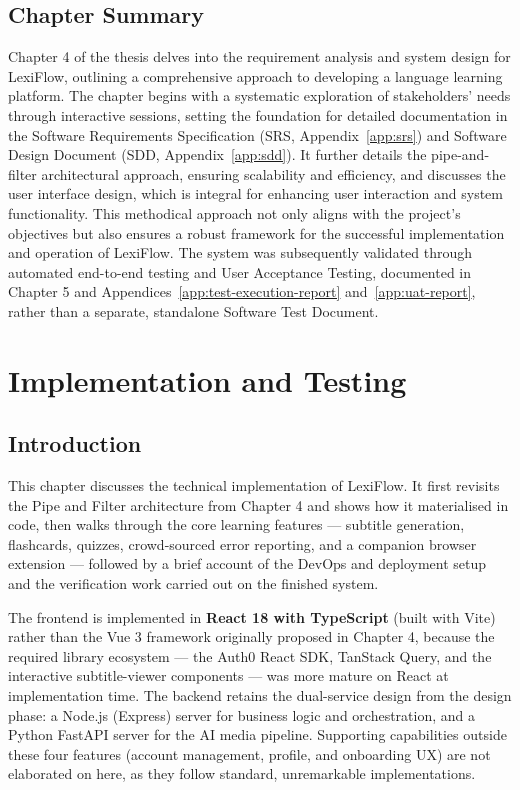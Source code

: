 \documentclass[oneside]{utmthesis}
\begin{document}
\section{Chapter Summary}
Chapter 4 of the thesis delves into the requirement analysis and system design for LexiFlow, outlining a comprehensive approach to developing a language learning platform. The chapter begins with a systematic exploration of stakeholders' needs through interactive sessions, setting the foundation for detailed documentation in the Software Requirements Specification (SRS, Appendix~\ref{app:srs}) and Software Design Document (SDD, Appendix~\ref{app:sdd}). It further details the pipe-and-filter architectural approach, ensuring scalability and efficiency, and discusses the user interface design, which is integral for enhancing user interaction and system functionality. This methodical approach not only aligns with the project's objectives but also ensures a robust framework for the successful implementation and operation of LexiFlow. The system was subsequently validated through automated end-to-end testing and User Acceptance Testing, documented in Chapter 5 and Appendices~\ref{app:test-execution-report} and~\ref{app:uat-report}, rather than a separate, standalone Software Test Document.


\chapter{Implementation and Testing}\label{chap:implementation}

\section{Introduction}
This chapter discusses the technical implementation of LexiFlow. It first revisits the Pipe and Filter architecture from Chapter 4 and shows how it materialised in code, then walks through the core learning features --- subtitle generation, flashcards, quizzes, crowd-sourced error reporting, and a companion browser extension --- followed by a brief account of the DevOps and deployment setup and the verification work carried out on the finished system.

The frontend is implemented in \textbf{React 18 with TypeScript} (built with Vite) rather than the Vue 3 framework originally proposed in Chapter 4, because the required library ecosystem --- the Auth0 React SDK, TanStack Query, and the interactive subtitle-viewer components --- was more mature on React at implementation time. The backend retains the dual-service design from the design phase: a Node.js (Express) server for business logic and orchestration, and a Python FastAPI server for the AI media pipeline. Supporting capabilities outside these four features (account management, profile, and onboarding UX) are not elaborated on here, as they follow standard, unremarkable implementations.
\end{document}
